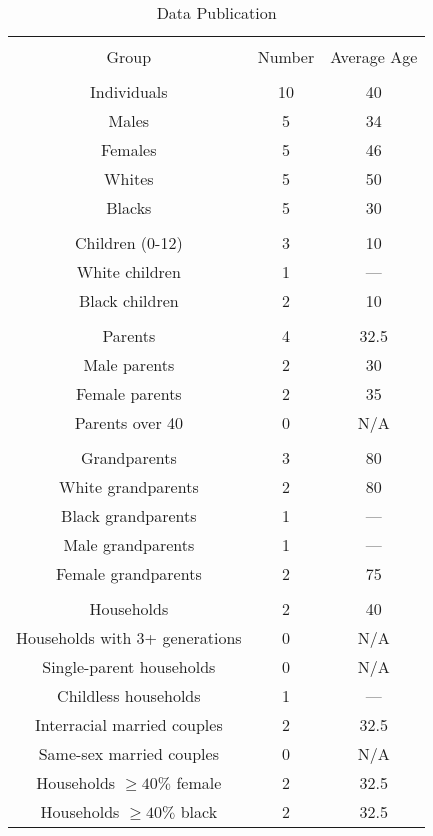 \documentclass[jou,apacite]{apa6}
\begin{document}
\begin{table}[!htb]
\caption{Data Publication}\label{tab8}
\begin{tabular}{ccc}
\hline\\[-1.5ex]
Group & Number & Average Age \\[0.5ex]
\hline\\[-1.5ex]
Individuals & 10 & 40 \\[0.5ex]
Males & 5 & 34 \\[0.5ex]
Females & 5 & 46 \\[0.5ex]
Whites & 5 & 50 \\[0.5ex]
Blacks & 5 & 30 \\[0.5ex]
\hline\\[-1.5ex]
Children (0-12) & 3 & 10 \\[0.5ex]
White children & 1 & --- \\[0.5ex]
Black children & 2 & 10 \\[0.5ex]
\hline\\[-1.5ex]
Parents & 4 & 32.5 \\[0.5ex]
Male parents & 2 & 30 \\[0.5ex]
Female parents & 2 & 35 \\[0.5ex]
Parents over 40 & 0 & N/A \\[0.5ex]
\hline\\[-1.5ex]
Grandparents & 3 & 80 \\[0.5ex]
White grandparents & 2 & 80 \\[0.5ex]
Black grandparents & 1 & --- \\[0.5ex]
Male grandparents & 1 & --- \\[0.5ex]
Female grandparents & 2 & 75 \\[0.5ex]
\hline\\[-1.5ex]
Households & 2 & 40 \\[0.5ex]
Households with 3+ generations & 0 & N/A \\[0.5ex]
Single-parent households & 0 & N/A \\[0.5ex]
Childless households & 1 & --- \\[0.5ex]
Interracial married couples & 2 & 32.5 \\[0.5ex]
Same-sex married couples & 0 & N/A \\[0.5ex]
Households $\geq 40\% $ female & 2 & 32.5 \\[0.5ex]
Households $\geq 40\% $ black & 2 & 32.5 \\[0.5ex]

\hline
\end{tabular}
\end{table}
\end{document}
